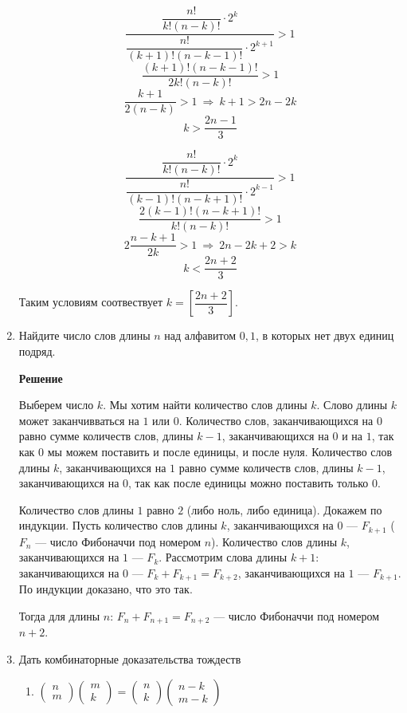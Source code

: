 \documentclass[12pt]{article}
\begin{document}
\begin{enumerate}[label={\textbf{\arabic{section}.\arabic*}}]
		\begin{minipage}{0.5\linewidth}
			$$
			\frac{\dfrac{n!}{k!(n-k)!}\cdot2^k}{\dfrac{n!}{(k+1)!(n-k-1)!}\cdot2^{k+1}} > 1
			$$
			$$
			\frac{(k+1)!(n-k-1)!}{2k!(n-k)!} > 1
			$$
			$$
			\frac{k+1}{2(n-k)} > 1~\Rightarrow~ k + 1 > 2n - 2k 
			$$
			$$
			k > \frac{2n-1}{3}
			$$
		\end{minipage}
		\hfill
		\begin{minipage}{0.5\linewidth}
			$$
			\frac{\dfrac{n!}{k!(n-k)!}\cdot2^k}{\dfrac{n!}{(k-1)!(n-k+1)!}\cdot2^{k-1}} > 1
			$$
			$$
			\frac{2(k-1)!(n-k+1)!}{k!(n-k)!} > 1
			$$
			$$
			2\frac{n-k+1}{2k} > 1~\Rightarrow~ 2n - 2k + 2 > k 
			$$
			$$
			k < \frac{2n+2}{3}
			$$
		\end{minipage}
	
		Таким условиям соотвествует $k = \left[\dfrac{2n+2}{3}\right]$.
		
		\item Найдите число слов длины $n$ над алфавитом ${0,1}$, в которых нет двух единиц подряд. 
		
		\textbf{Решение}
		
		Выберем число $k$. Мы хотим найти количество слов длины $k$. Слово длины $k$ может заканчивваться на $1$ или $0$. Количество слов, заканчивающихся на $0$ равно сумме количеств слов, длины $k-1$, заканчивающихся на $0$ и на $1$, так как $0$ мы можем поставить и после единицы, и после нуля. Количество слов длины $k$, заканчивающихся на $1$ равно сумме количеств слов, длины $k-1$, заканчивающихся на $0$, так как после единицы можно поставить только $0$.
		
		Количество слов длины $1$ равно $2$ (либо ноль, либо единица). Докажем по индукции. Пусть количество слов длины $k$, заканчивающихся на $0$ --- $F_{k+1}$ ($F_n$ --- число Фибоначчи под номером $n$). Количество слов длины $k$, заканчивающихся на $1$ --- $F_{k}$. Рассмотрим слова длины $k+1$: заканчивающихся на $0$ --- $F_k + F_{k+1} = F_{k+2}$, заканчивающихся на $1$ --- $F_{k+1}$. По индукции доказано, что это так. 
		
		Тогда для длины $n$: $F_n + F_{n + 1} = F_{n+2}$ --- число Фибоначчи под номером $n+2$.
		
		\item Дать комбинаторные доказательства тождеств
		\begin{enumerate}[label=\textbf{\alph*)}]
			\item 
			$
			\begin{pmatrix}
				n \\
				m
			\end{pmatrix}
			\begin{pmatrix}
				m \\
				k
			\end{pmatrix} =
			\begin{pmatrix}
				n \\
				k
			\end{pmatrix}
			\begin{pmatrix}
				n - k \\
				m - k
			\end{pmatrix}
			$
			

\end{enumerate}
\end{enumerate}
\end{document}

